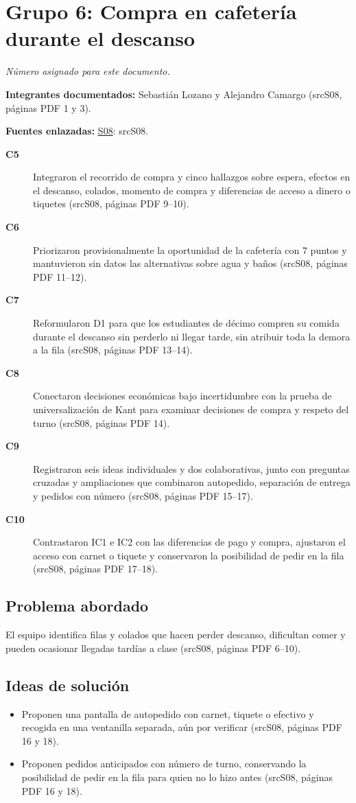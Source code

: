 \documentclass[11pt,a4paper]{article}
\newcommand{\evid}[2]{(\csname src#1\endcsname, páginas PDF #2)}
\begin{document}
\section*{Grupo 6: Compra en cafetería durante el descanso}
\textit{Número asignado para este documento.}

\textbf{Integrantes documentados:} Sebastián Lozano y Alejandro Camargo \evid{S08}{1 y 3}.

\textbf{Fuentes enlazadas:} \hyperlink{fuente-S08}{S08}: \csname srcS08\endcsname.

\begin{description}
\item[\textbf{C5}] Integraron el recorrido de compra y cinco hallazgos sobre espera, efectos en el descanso, colados, momento de compra y diferencias de acceso a dinero o tiquetes \evid{S08}{9--10}.
\item[\textbf{C6}] Priorizaron provisionalmente la oportunidad de la cafetería con 7 puntos y mantuvieron sin datos las alternativas sobre agua y baños \evid{S08}{11--12}.
\item[\textbf{C7}] Reformularon D1 para que los estudiantes de décimo compren su comida durante el descanso sin perderlo ni llegar tarde, sin atribuir toda la demora a la fila \evid{S08}{13--14}.
\item[\textbf{C8}] Conectaron decisiones económicas bajo incertidumbre con la prueba de universalización de Kant para examinar decisiones de compra y respeto del turno \evid{S08}{14}.
\item[\textbf{C9}] Registraron seis ideas individuales y dos colaborativas, junto con preguntas cruzadas y ampliaciones que combinaron autopedido, separación de entrega y pedidos con número \evid{S08}{15--17}.
\item[\textbf{C10}] Contrastaron IC1 e IC2 con las diferencias de pago y compra, ajustaron el acceso con carnet o tiquete y conservaron la posibilidad de pedir en la fila \evid{S08}{17--18}.
\end{description}
\subsection*{Problema abordado}
El equipo identifica filas y colados que hacen perder descanso, dificultan comer y pueden ocasionar llegadas tardías a clase \evid{S08}{6--10}.
\subsection*{Ideas de solución}
\begin{itemize}
\item Proponen una pantalla de autopedido con carnet, tiquete o efectivo y recogida en una ventanilla separada, aún por verificar \evid{S08}{16 y 18}.
\item Proponen pedidos anticipados con número de turno, conservando la posibilidad de pedir en la fila para quien no lo hizo antes \evid{S08}{16 y 18}.
\end{itemize}
\clearpage
\end{document}
